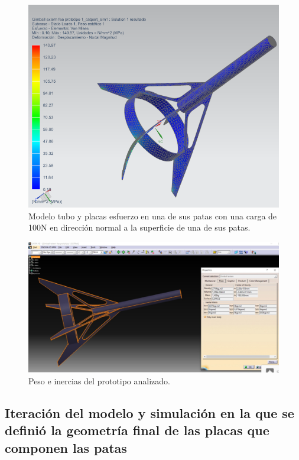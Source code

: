 \begin{figure}[htb]
    \centering
    \includegraphics[width=\linewidth]{fig/fea/tuboplaca5.png}
    \caption{Modelo tubo y placas esfuerzo en una de sus patas con una carga de 100N en dirección normal a la superficie de una de sus patas.}
    \label{fig:fea/tuboplaca5}
\end{figure}

\begin{figure}[htb]
    \centering
    \includegraphics[width=\linewidth]{fig/fea/inercias}
    \caption{Peso e inercias del prototipo analizado.}
    \label{fig:fea/tuboplacainercias}
\end{figure}

\null\newpage
\clearpage

\subsection{Iteración del modelo y simulación en la que se definió la geometría final de las placas que componen las patas}

